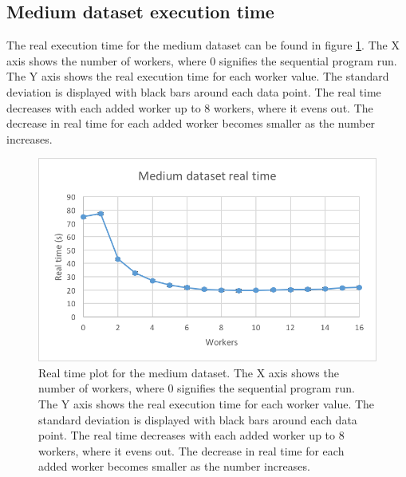 \subsection{Medium dataset execution time}
The real execution time for the medium dataset can be found in figure \ref{fig:dataset_3_real_time}.
The X axis shows the number of workers, where 0 signifies the sequential program run.
The Y axis shows the real execution time for each worker value. The standard deviation is displayed with black bars around each data point. The real time
decreases with each added worker up to 8 workers, where it evens out. The decrease in real time for each added worker becomes smaller as the number increases.
\begin{figure}[ht]
  \centering
  \includegraphics[width=120mm]{figures/dataset_3/dataset_3_real_time.png}
  \caption[Real time plot for the medium dataset.]{Real time plot for the medium dataset. The X axis shows the number of workers, where 0 signifies the sequential program run.
  The Y axis shows the real execution time for each worker value. The standard deviation is displayed with black bars around each data point. The real time
  decreases with each added worker up to 8 workers, where it evens out. The decrease in real time for each added worker becomes smaller as the number increases.}
  \label{fig:dataset_3_real_time}
\end{figure}

